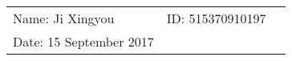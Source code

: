 \documentclass{article}
\begin{document}
\begin{spacing}{2.0}
\vspace*{0.25cm}

\hrulefill

\thispagestyle{empty}

\begin{center}
\begin{large}
\end{large}

\hrulefill

\vspace*{5cm}
\begin{Large}
\end{Large}

\vspace{2em}

\end{center}


\vfill

\begin{table}[h!]
\flushleft
\begin{tabular}{lll}
Name: Ji Xingyou \hspace*{2em}&
ID: 515370910197\hspace*{2em}
\\

Date: 15 September 2017

\end{tabular}
\end{table}

\hfill


\end{spacing}
\end{document}
